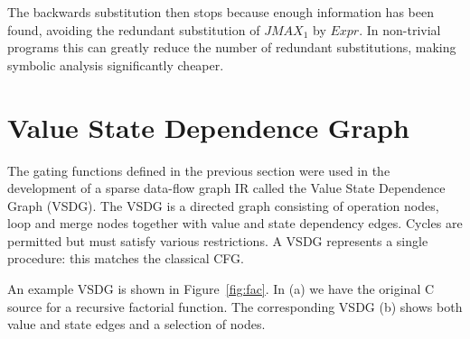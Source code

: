 
The backwards substitution then stops because enough information has been found, avoiding the redundant substitution of ${JMAX_1}$ by ${Expr}$. 
In non-trivial programs this can greatly reduce the number of redundant substitutions, making symbolic analysis significantly cheaper.

\section{Value State Dependence Graph}

The gating functions defined in the previous section were used in the development of a sparse data-flow graph IR called the Value State Dependence Graph (VSDG). 
The VSDG is a directed graph consisting of operation nodes, loop and merge nodes together with value and state dependency edges. 
Cycles are permitted but must satisfy various restrictions. 
A VSDG represents a single procedure: 
this matches the classical CFG.

An example VSDG is shown in Figure~\ref{fig:fac}. 
In (a) we have the original C source for a recursive factorial function. 
The corresponding VSDG (b) shows both value and state edges and a selection of nodes.

